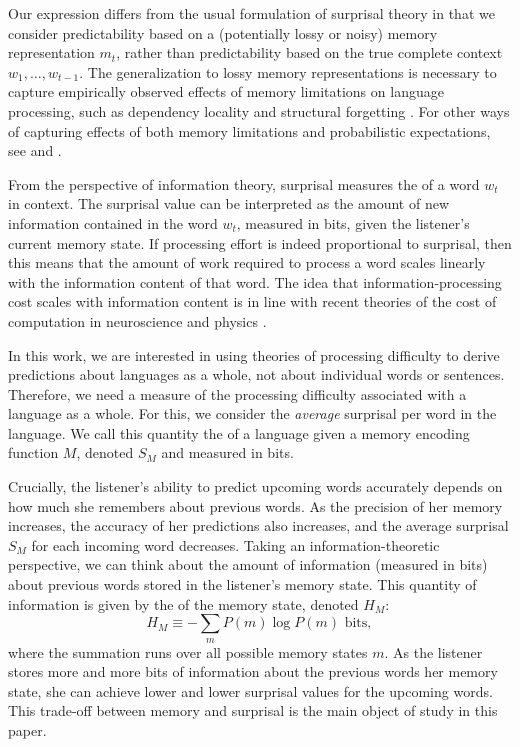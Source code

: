 Our expression differs from the usual formulation of surprisal theory in that we consider predictability based on a (potentially lossy or noisy) memory representation $m_t$, rather than predictability based on the true complete context $w_1, \dots, w_{t-1}$. The generalization to lossy memory representations is necessary to capture empirically observed effects of memory limitations on language processing, such as dependency locality and structural forgetting \citep{futrell-noisy-context-2017,futrell2019information}. For other ways of capturing effects of both memory limitations and probabilistic expectations, see \citet{demberg-incremental-2013} and \citet{rasmussen-2017-left}.

From the perspective of information theory, surprisal measures the  of a word $w_t$ in context. The surprisal value can be interpreted as the amount of new information contained in the word $w_t$, measured in bits, given the listener's current memory state. If processing effort is indeed proportional to surprisal, then this means that the amount of work required to process a word scales linearly with the information content of that word. The idea that information-processing cost scales with information content is in line with recent theories of the cost of computation in neuroscience \citep{friston2010free,zenon2019information} and physics \citep{still2012thermodynamics}. 

In this work, we are interested in using theories of processing difficulty to derive predictions about languages as a whole, not about individual words or sentences. Therefore, we need a measure of the processing difficulty associated with a language as a whole. For this, we consider the \emph{average} surprisal per word in the language. We call this quantity the  of a language given a memory encoding function $M$, denoted $S_M$ and measured in bits.

Crucially, the listener's ability to predict upcoming words accurately depends on how much she remembers about previous words. As the precision of her memory increases, the accuracy of her predictions also increases, and the average surprisal $S_M$ for each incoming word decreases. Taking an information-theoretic perspective, we can think about the amount of information (measured in bits) about previous words stored in the listener's memory state. This quantity of information is given by the  of the memory state, denoted $H_M$:
\begin{equation}
    H_M \equiv - \sum_m P(m) \log P(m) \text{ bits},
\end{equation}
where the summation runs over all possible memory states $m$. As the listener stores more and more bits of information about the previous words her memory state, she can achieve lower and lower surprisal values for the upcoming words. This trade-off between memory and surprisal is the main object of study in this paper.

